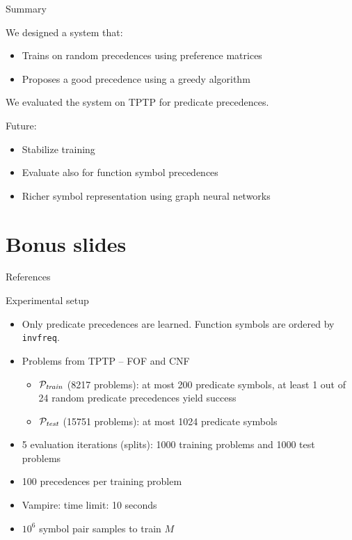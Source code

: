 \documentclass[notes]{beamer}
\begin{document}
\begin{frame}{Summary}

We designed a system that:

\begin{itemize}
	\item Trains on random precedences using preference matrices
	\item Proposes a good precedence using a greedy algorithm
\end{itemize}

We evaluated the system on TPTP for predicate precedences.

\vspace{.5cm}

Future:
\begin{itemize}
	\item Stabilize training
	\item Evaluate also for function symbol precedences
	\item Richer symbol representation using graph neural networks
\end{itemize}

\end{frame}

\section{Bonus slides}

\begin{frame}[noframenumbering]
\sectionpage
\end{frame}

\begin{frame}[noframenumbering]{References}


\end{frame}

\begin{frame}[noframenumbering]{Experimental setup}
\begin{itemize}
	\item Only predicate precedences are learned.
	Function symbols are ordered by \texttt{invfreq}.
	\item Problems from TPTP \cite{Sut17} -- FOF and CNF
	\begin{itemize}
		\item $\mathcal{P}_{\mathit{train}}$ (8217 problems):
		at most 200 predicate symbols,
		at least 1 out of 24 random predicate precedences yield success
		\item $\mathcal{P}_{\mathit{test}}$ (15751 problems):
		at most 1024 predicate symbols
	\end{itemize}
	\item 5 evaluation iterations (splits): 1000 training problems and 1000 test problems
	\item 100 precedences per training problem
	\item Vampire: time limit: 10 seconds
	\item $10^6$ symbol pair samples to train $M$
\end{itemize}
\end{frame}
\end{document}
